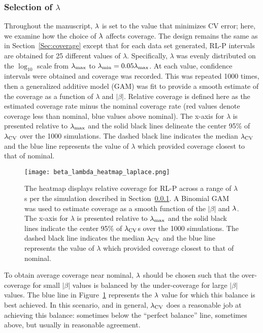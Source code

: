 \subsubsection{Selection of \texorpdfstring{$\lambda$}{lambda}} \label{Sec:lambda}

Throughout the manuscript, $\lambda$ is set to the value that minimizes CV error; here, we examine how the choice of $\lambda$ affects coverage. The design remains the same as in Section~\ref{Sec:coverage} except that for each data set generated, RL-P intervals are obtained for 25 different values of $\lambda$. Specifically, $\lambda$ was evenly distributed on the $\log_{10}$ scale from $\lambda_{\max}$ to $\lambda_{\min} = 0.05 \lambda_{\max}$. At each value, confidence intervals were obtained and coverage was recorded. This was repeated 1000 times, then a generalized additive model (GAM) was fit to provide a smooth estimate of the coverage as a function of $\lambda$ and $|\beta|$. Relative coverage is defined here as the estimated coverage rate minus the nominal coverage rate (red values denote coverage less than nominal, blue values above nominal). The x-axis for $\lambda$ is presented relative to $\lambda_{\max}$ and the solid black lines delineate the center 95\% of $\lambda_{\textrm{CV}}$ over the 1000 simulations. The dashed black line indicates the median $\lambda_{\textrm{CV}}$ and the blue line represents the value of $\lambda$ which provided coverage closest to that of nominal.

\begin{figure}[htb!]
  \begin{center}
  \texttt{[image: beta\_lambda\_heatmap\_laplace.png]}
  \caption{\label{Fig:beta_lambda_heatmap_laplace} The heatmap displays relative coverage for RL-P across a range of $\lambda$s per the simulation described in Section~\ref{Sec:lambda}. A Binomial GAM was used to estimate coverage as a smooth function of the $|\beta|$ and $\lambda$. The x-axis for $\lambda$ is presented relative to $\lambda_{\max}$ and the solid black lines indicate the center 95\% of $\lambda_{\textrm{CV}}$s over the 1000 simulations. The dashed black line indicates the median $\lambda_{\textrm{CV}}$ and the blue line represents the value of $\lambda$ which provided coverage closest to that of nominal.}
  \end{center}
\end{figure}

To obtain average coverage near nominal, $\lambda$ should be chosen such that the over-coverage for small $|\beta|$ values is balanced by the under-coverage for large $|\beta|$ values. The blue line in Figure~\ref{Fig:beta_lambda_heatmap_laplace} represents the $\lambda$ value for which this balance is best achieved. In this scenario, and in general, $\lambda_{\textrm{CV}}$ does a reasonable job at achieving this balance: sometimes below the ``perfect balance'' line, sometimes above, but usually in reasonable agreement.

